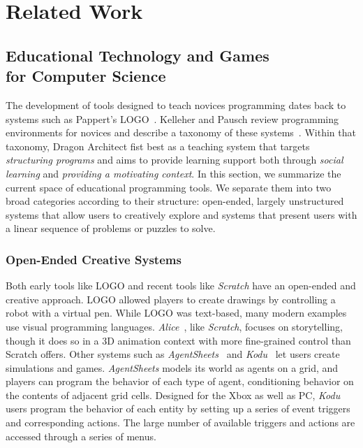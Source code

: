 \documentclass{sig-alternate}
\newcommand{\gametitle}{{Dragon Architect}}
\begin{document}
\section{Related Work}

\subsection{Educational Technology and Games\\for Computer Science}

The development of tools designed to teach novices programming dates back to systems such as Pappert's LOGO~\cite{papert80mindstorms}.
Kelleher and Pausch review programming environments for novices and describe a taxonomy of these systems~\cite{kelleher2005lowering}.
Within that taxonomy, \gametitle{} fist best as a teaching system that targets \emph{structuring programs} and aims to provide learning support both through \emph{social learning} and \emph{providing a motivating context}. 
In this section, we summarize the current space of educational programming tools. 
We separate them into two broad categories according to their structure: open-ended, largely unstructured systems that allow users to creatively explore and systems that present users with a linear sequence of problems or puzzles to solve. 

\subsubsection{Open-Ended Creative Systems}
Both early tools like LOGO and recent tools like \emph{Scratch} have an open-ended and creative approach.
LOGO allowed players to create drawings by controlling a robot with a virtual pen.
While LOGO was text-based, many modern examples use visual programming languages. 
\emph{Alice}~\cite{cooper2000alice}, like \emph{Scratch}, focuses on storytelling, though it does so in a 3D animation context with more fine-grained control than Scratch offers.
Other systems such as \emph{AgentSheets}~\cite{repenning2000agentsheets} and \emph{Kodu}~\cite{kodu} let users create simulations and games.
\emph{AgentSheets} models its world as agents on a grid, and players can program the behavior of each type of agent, conditioning behavior on the contents of adjacent grid cells. 
Designed for the Xbox as well as PC, \emph{Kodu} users program the behavior of each entity by setting up a series of event triggers and corresponding actions. The large number of available triggers and actions are accessed through a series of menus. 
\end{document}
